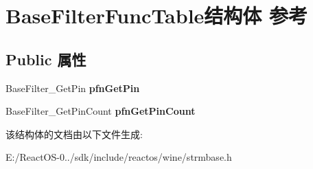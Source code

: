\hypertarget{struct_base_filter_func_table}{}\section{Base\+Filter\+Func\+Table结构体 参考}
\label{struct_base_filter_func_table}
\subsection*{Public 属性}
\begin{DoxyCompactItemize}
\item 
\mbox{\label{struct_base_filter_func_table_ab49ee79d7b1e4d7931f3cf5eaf566b0b}} 
Base\+Filter\+\_\+\+Get\+Pin {\bfseries pfn\+Get\+Pin}
\item 
\mbox{\label{struct_base_filter_func_table_afb49c21c3ffa9296bb77d5cc5e22bf94}} 
Base\+Filter\+\_\+\+Get\+Pin\+Count {\bfseries pfn\+Get\+Pin\+Count}
\end{DoxyCompactItemize}


该结构体的文档由以下文件生成\+:\begin{DoxyCompactItemize}
\item 
E\+:/\+React\+O\+S-\/0../sdk/include/reactos/wine/strmbase.\+h\end{DoxyCompactItemize}
